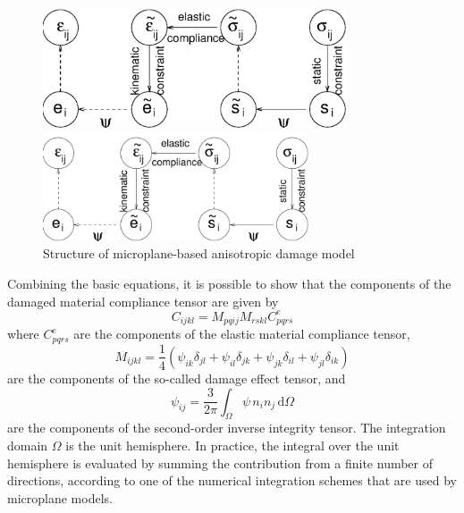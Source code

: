 \documentclass[a4paper]{article}
\newcommand{\dO}{\,\mbox{d}\Omega}
\newcommand{\quarter}{\mbox{$\frac{1}{4}$}}
\begin{document}
\begin{figure}[!htb]
\begin{htmlonly}
  \centerline{\includegraphics[width=0.8\textwidth]{dm_comp.eps}}
\end{htmlonly}
 \centerline{\includegraphics[width=0.7\textwidth]{dm_comp}}
\caption{Structure of microplane-based anisotropic damage model}
\label{ff4}
\end{figure}

Combining the basic equations, it is possible to show that the
components of the damaged
material compliance tensor are given by
\begin{equation}
\label{damcom}
C_{ijkl}=M_{pqij}M_{rskl}C^e_{pqrs}
\end{equation}
where $C^e_{pqrs}$ are the components of the elastic material compliance tensor,
\begin{equation}
\label{ee27}
M_{ijkl} = \quarter\left(
\psi_{ik}\delta_{jl}+\psi_{il}\delta_{jk}+\psi_{jk}\delta_{il}+\psi_{jl}\delta_{ik}\right)
\end{equation}
are the components of the so-called damage effect tensor, and
\begin{equation}
\label{ee24}
\psi_{ij} = \frac{3}{2\pi}\int_\Omega \psi\, n_i n_j \dO
\end{equation}
are the components of the second-order inverse integrity tensor.
The integration domain $\Omega$ is the unit hemisphere.
In practice, the integral over the unit hemisphere is evaluated by
summing the contribution from a finite number of directions, according
to one of the numerical integration schemes that are used by microplane
models.
\end{document}

